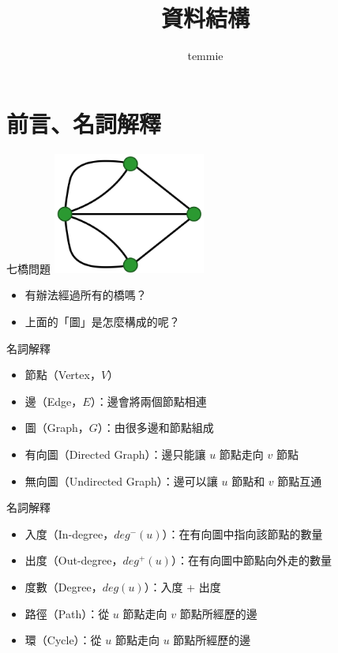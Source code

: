 \documentclass[mathserif]{beamer}
\title{資料結構}
\author{temmie}
\date{}
\begin{document}
\begin{frame}
    \titlepage
\end{frame}

\begin{frame}
    \tableofcontents
\end{frame}

\section{前言、名詞解釋}

\begin{frame}{七橋問題}
    \includegraphics[width=5.0cm]{img/bridge.png}
    \begin{itemize}
        \item 有辦法經過所有的橋嗎？
        \item 上面的「圖」是怎麼構成的呢？
    \end{itemize}
\end{frame}

\begin{frame}{名詞解釋}
    \begin{itemize}
        \item 節點（Vertex，$V$）
        \item 邊（Edge，$E$）：邊會將兩個節點相連
        \item 圖（Graph，$G$）：由很多邊和節點組成
        \item 有向圖（Directed Graph）：邊只能讓 $u$ 節點走向 $v$ 節點
        \item 無向圖（Undirected Graph）：邊可以讓 $u$ 節點和 $v$ 節點互通
    \end{itemize}
\end{frame}

\begin{frame}{名詞解釋}
    \begin{itemize}
        \item 入度（In-degree，$deg^-(u)$）：在有向圖中指向該節點的數量
        \item 出度（Out-degree，$deg^+(u)$）：在有向圖中節點向外走的數量
        \item 度數（Degree，$deg(u)$）：入度 + 出度
        \item 路徑（Path）：從 $u$ 節點走向 $v$ 節點所經歷的邊
        \item 環（Cycle）：從 $u$ 節點走向 $u$ 節點所經歷的邊
    \end{itemize}
\end{frame}
\end{document}
